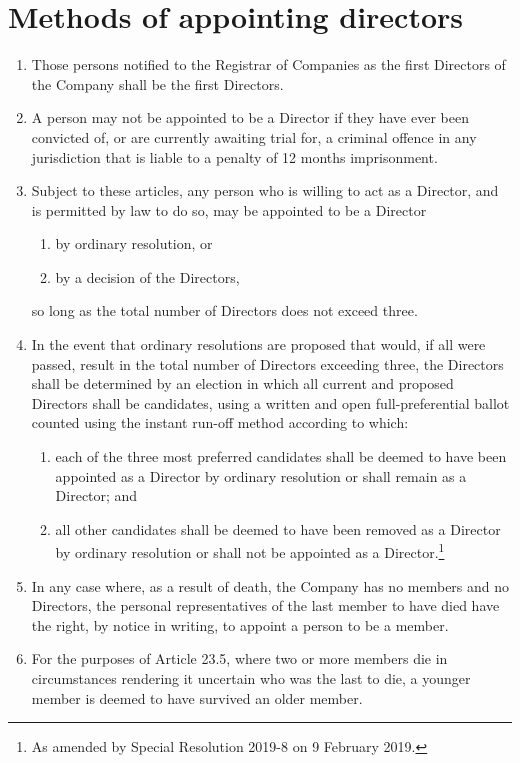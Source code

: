 \documentclass[a4paper,12pt]{article}
\renewcommand{\labelenumii}{(\alph{enumii})}
\begin{document}
\section{Methods of appointing directors}

\begin{enumerate}
  \item Those persons notified to the Registrar of Companies as the first Directors of the Company shall be the first Directors.
  \item A person may not be appointed to be a Director if they have ever been convicted of, or are currently awaiting trial for, a criminal offence in any jurisdiction that is liable to a penalty of 12 months imprisonment.
  \item Subject to these articles, any person who is willing to act as a Director, and is permitted by law to do so, may be appointed to be a Director
  \begin{enumerate}
    \renewcommand{\labelenumii}{(\alph{enumii})}
    \item by ordinary resolution, or
    \item by a decision of the Directors,
  \end{enumerate}
  so long as the total number of Directors does not exceed three.
  \item  In the event that ordinary resolutions are proposed that would, if all were passed, result in the total number of Directors exceeding three, the Directors shall be determined by an election in which all current and proposed Directors shall be candidates, using a written and open full-preferential ballot counted using the instant run-off method according to which:
  \begin{enumerate}
    \item each of the three most preferred candidates shall be deemed to have been appointed as a Director by ordinary resolution or shall remain as a Director; and
    \item all other candidates shall be deemed to have been removed as a Director by ordinary resolution or shall not be appointed as a Director.\footnote{As amended by Special Resolution 2019-8 on 9 February 2019.}
  \end{enumerate}
  \item In any case where, as a result of death, the Company has no members and no Directors, the personal representatives of the last member to have died have the right, by notice in writing, to appoint a person to be a member.
  \item For the purposes of Article 23.5, where two or more members die in circumstances rendering it uncertain who was the last to die, a younger member is deemed to have survived an older member.
\end{enumerate}
\end{document}
